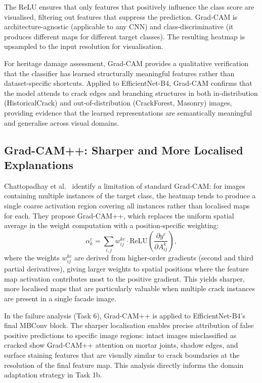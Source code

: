 \documentclass[12pt,a4paper]{article}
\begin{document}
The ReLU ensures that only features that positively influence the class score are visualised, filtering out features that suppress the prediction. Grad-CAM is architecture-agnostic (applicable to any CNN) and class-discriminative (it produces different maps for different target classes). The resulting heatmap is upsampled to the input resolution for visualisation.

For heritage damage assessment, Grad-CAM provides a qualitative verification that the classifier has learned structurally meaningful features rather than dataset-specific shortcuts. Applied to EfficientNet-B4, Grad-CAM confirms that the model attends to crack edges and branching structures in both in-distribution (HistoricalCrack) and out-of-distribution (CrackForest, Masonry) images, providing evidence that the learned representations are semantically meaningful and generalise across visual domains.

\subsection{Grad-CAM++: Sharper and More Localised Explanations}

Chattopadhay et al.~\cite{surv:chattopadhay2018gradcampp} identify a limitation of standard Grad-CAM: for images containing multiple instances of the target class, the heatmap tends to produce a single coarse activation region covering all instances rather than localised maps for each. They propose Grad-CAM++, which replaces the uniform spatial average in the weight computation with a position-specific weighting:
\begin{equation}
  \alpha_k^c = \sum_{i,j} w^{kc}_{ij} \cdot \text{ReLU}\!\left(\frac{\partial y^c}{\partial A^k_{ij}}\right),
\end{equation}
where the weights $w^{kc}_{ij}$ are derived from higher-order gradients (second and third partial derivatives), giving larger weights to spatial positions where the feature map activation contributes most to the positive gradient. This yields sharper, more localised maps that are particularly valuable when multiple crack instances are present in a single facade image.

In the failure analysis (Task 6), Grad-CAM++ is applied to EfficientNet-B4's final MBConv block. The sharper localisation enables precise attribution of false positive predictions to specific image regions: intact images misclassified as cracked show Grad-CAM++ attention on mortar joints, shadow edges, and surface staining features that are visually similar to crack boundaries at the resolution of the final feature map. This analysis directly informs the domain adaptation strategy in Task 1b.
\end{document}
